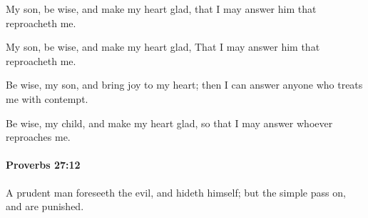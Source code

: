 			My son, be wise, and make my heart glad, that I may answer him that reproacheth me.

			\begin{versebox}
					\item[BHS] 
					\item[ASV] My son, be wise, and make my heart glad, That I may answer him that reproacheth me.
					\item[NIV] Be wise, my son, and bring joy to my heart; then I can answer anyone who treats me with contempt.
					\item[NRSV] Be wise, my child, and make my heart glad, so that I may answer whoever reproaches me.
			\end{versebox}

		\paragraph{Proverbs 27:12} %
			\label{PROVERBS-27-12}

			A prudent man foreseeth the evil, and hideth himself; but the simple pass on, and are punished.

